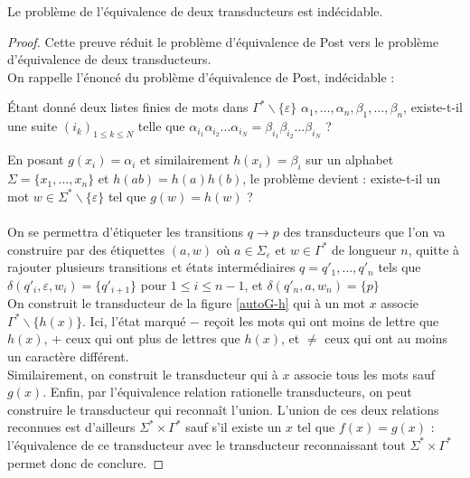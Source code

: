 \documentclass{scrartcl}
\begin{document}
\begin{flushleft}
\begin{theorem}
    Le problème de l'équivalence de deux transducteurs est indécidable.
\end{theorem}

\begin{proof}
    Cette preuve réduit le problème d'équivalence de Post vers le problème d'équivalence de deux transducteurs.\\
    On rappelle l'énoncé du problème d'équivalence de Post, indécidable :
    \begin{define}
        Étant donné deux listes finies de mots dans $\Gamma^*\backslash \{\varepsilon\}$ $\alpha_1, \dots, \alpha_n , \beta_1, \dots, \beta_n$,
        existe-t-il une suite $(i_k)_{1\leq k \leq N}$ telle que $\alpha_{i_1} \alpha_{i_2} \dots \alpha_{i_N} = \beta_{i_1} \beta_{i_2} \dots \beta_{i_N}$ ?
    \end{define}

    En posant $g(x_i)=\alpha_i$ et similairement $h(x_i)=\beta_i$ sur un alphabet $\Sigma=\{x_1, \dots, x_n\}$ et $h(ab) = h(a)h(b)$,
    le problème devient : existe-t-il un mot $w\in \Sigma^*\backslash \{\varepsilon \}$ tel que $g(w) = h(w)$ ?
    \\~\\
    On se permettra d'étiqueter les transitions $q \rightarrow p$ des transducteurs que l'on va construire par des étiquettes $(a, w)$ où
    $a \in \Sigma_{\varepsilon}$ et $w \in \Gamma^*$ de longueur $n$, quitte à rajouter plusieurs transitions et états intermédiaires $q = q'_1, ..., q'_n$
    tels que $\delta(q'_i, \varepsilon, w_i) = \{q'_{i+1}\}$ pour $1 \leq i \leq n-1$, et $\delta(q'_n, a, w_n) = \{p\}$\\
    On construit le transducteur de la figure \ref{autoG-h} qui à un mot $x$ associe $\Gamma^* \backslash \{h(x)\}$.
    Ici, l'état marqué $-$ reçoit les mots qui ont moins de lettre que $h(x)$, $+$ ceux qui ont plus de lettres que $h(x)$, et $\neq$
    ceux qui ont au moins un caractère différent.\\
    Similairement, on construit le transducteur qui à $x$ associe tous les mots sauf $g(x)$. Enfin, par l'équivalence relation rationelle transducteurs, on
    peut construire le transducteur qui reconnaît l'union. L'union de ces deux relations reconnues est d'ailleurs $\Sigma^* \times \Gamma^*$ sauf 
    s'il existe un $x$ tel que $f(x) = g(x)$ : l'équivalence de ce transducteur avec le transducteur reconnaissant tout $\Sigma^* \times
    \Gamma^*$ permet donc de conclure.


\end{proof}
\end{flushleft}
\end{document}
